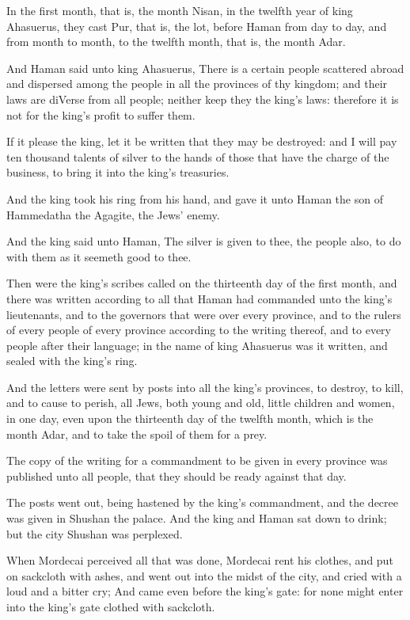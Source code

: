 \Verse In the first month, that is, the month Nisan, in the twelfth year of king Ahasuerus, they cast Pur, that is, the lot, before Haman from day to day, and from month to month, to the twelfth month, that is, the month Adar.

\Verse And Haman said unto king Ahasuerus, There is a certain people scattered abroad and dispersed among the people in all the provinces of thy kingdom; and their laws are diVerse from all people; neither keep they the king's laws: therefore it is not for the king's profit to suffer them.

\Verse If it please the king, let it be written that they may be destroyed: and I will pay ten thousand talents of silver to the hands of those that have the charge of the business, to bring it into the king's treasuries.

\Verse And the king took his ring from his hand, and gave it unto Haman the son of Hammedatha the Agagite, the Jews' enemy.

\Verse And the king said unto Haman, The silver is given to thee, the people also, to do with them as it seemeth good to thee.

\Verse Then were the king's scribes called on the thirteenth day of the first month, and there was written according to all that Haman had commanded unto the king's lieutenants, and to the governors that were over every province, and to the rulers of every people of every province according to the writing thereof, and to every people after their language; in the name of king Ahasuerus was it written, and sealed with the king's ring.

\Verse And the letters were sent by posts into all the king's provinces, to destroy, to kill, and to cause to perish, all Jews, both young and old, little children and women, in one day, even upon the thirteenth day of the twelfth month, which is the month Adar, and to take the spoil of them for a prey.

\Verse The copy of the writing for a commandment to be given in every province was published unto all people, that they should be ready against that day.

\Verse The posts went out, being hastened by the king's commandment, and the decree was given in Shushan the palace. And the king and Haman sat down to drink; but the city Shushan was perplexed.


\Chapter
\Verse When Mordecai perceived all that was done, Mordecai rent his clothes, and put on sackcloth with ashes, and went out into the midst of the city, and cried with a loud and a bitter cry; \Verse And came even before the king's gate: for none might enter into the king's gate clothed with sackcloth.

